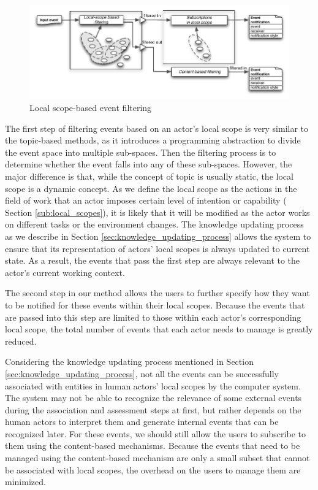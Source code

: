 \begin{figure}[htbp] %
	\centering
	\includegraphics{event_filtering.pdf} 
	\caption{Local scope-based event filtering}
	\label{fig:event_filtering}
\end{figure}

The first step of filtering events based on an actor's local scope is very similar to the topic-based methods, as it introduces a programming abstraction to divide the event space into multiple sub-spaces. Then the filtering process is to determine whether the event falls into any of these sub-spaces. However, the major difference is that, while the concept of topic is usually static, the local scope is a dynamic concept. As we define the local scope as the actions in the field of work that an actor imposes certain level of intention or capability ( Section \ref{sub:local_scopes}), it is likely that it will be modified as the actor works on different tasks or the environment changes. The knowledge updating process as we describe in Section \ref{sec:knowledge_updating_process} allows the system to ensure that its representation of actors' local scopes is always updated to current state. As a result, the events that pass the first step are always relevant to the actor's current working context. 

The second step in our method allows the users to further specify how they want to be notified for these events within their local scopes. Because the events that are passed into this step are limited to those within each actor's corresponding local scope, the total number of events that each actor needs to manage is greatly reduced.

Considering the knowledge updating process mentioned in Section \ref{sec:knowledge_updating_process}, not all the events can be successfully associated with entities in human actors' local scopes by the computer system. The system may not be able to recognize the relevance of some external events during the association and assessment steps at first, but rather depends on the human actors to interpret them and generate internal events that can be recognized later. For these events, we should still allow the users to subscribe to them using the content-based mechanisms. Because the events that need to be managed using the content-based mechanism are only a small subset that cannot be associated with local scopes, the overhead on the users to manage them are minimized.  

